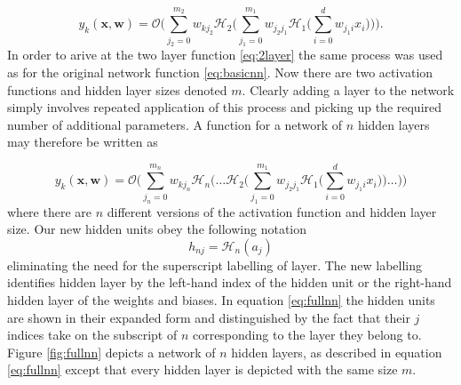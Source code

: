 \begin{equation}
y_k(\boldsymbol{x},\boldsymbol{w}) = \mathcal{O} \Bigg( \sum_{j_{2}=0}^{m_{2}} w_{kj_{2}} \mathcal{H}_{2} 
\Bigg( \sum_{j_{1}=0}^{m_{1}} w_{j_{2}j_{1}} \mathcal{H}_{1} \Bigg( \sum_{i=0}^{d} w_{j_{1}i} x_{i} \Bigg) \Bigg) \Bigg).
\label{eq:2layer}
\end{equation}
In order to arive at the two layer function \eqref{eq:2layer} the same process
was used as for the original network function \eqref{eq:basicnn}. Now there are
two activation functions and hidden layer sizes denoted $m$. Clearly adding a
layer to the network simply involves repeated application of this process and
picking up the required number of additional parameters. A function for a
network of $n$ hidden layers may therefore be written as

\begin{equation}
y_k(\boldsymbol{x},\boldsymbol{w}) = \mathcal{O} \Bigg( \sum_{j_{n}=0}^{m_{n}} w_{kj_{n}}
\mathcal{H}_{n} \Bigg( \dots \mathcal{H}_2  \Bigg( \sum_{j_{1}=0}^{m_{1}} w_{j_{2}j_{1}} 
\mathcal{H}_{1} \Bigg( \sum_{i=0}^{d} w_{j_{1}i} x_{i} \Bigg) \Bigg) \dots \Bigg) \Bigg)
\label{eq:fullnn}
\end{equation}
where there are $n$ different versions of the activation function and hidden
layer size. Our new hidden units obey the following notation
\begin{equation}
h_{nj} = \mathcal{H}_n(a_j)
\label{eq:newhiddenunits}
\end{equation}
eliminating the need for the superscript labelling of layer. The new labelling
identifies hidden layer by the left-hand index of the hidden unit or the
right-hand hidden layer of the weights and biases. In equation \eqref{eq:fullnn}
the hidden units are shown in their expanded form and distinguished by the fact
that their $j$ indices take on the subscript of $n$ corresponding to the layer
they belong to. Figure \ref{fig:fullnn} depicts a network of $n$ hidden layers,
as described in equation \eqref{eq:fullnn} except that every hidden layer is
depicted with the same size $m$.

